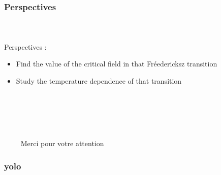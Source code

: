 \documentclass{beamer}
\begin{document}
\begin{frame}
	\frametitle{Perspectives}
	\framesubtitle{\ }
    Perspectives :
    \begin{itemize}
        \item Find the value of the critical field in that Fréedericksz transition 
        \item Study the temperature dependence of that transition
    \end{itemize}

\end{frame}

\begin{frame}
	\frametitle{\ }
	\framesubtitle{\ }

{\center $\qquad$ \Huge Merci pour votre attention}

\end{frame}

\begin{frame}
	\frametitle{yolo}
	\framesubtitle{\ }


\end{frame}


\end{document}
